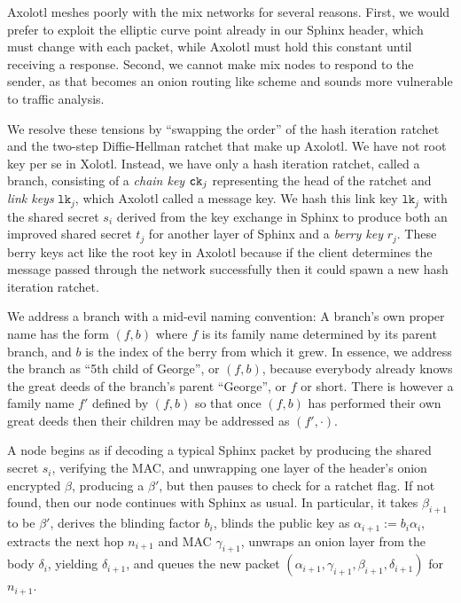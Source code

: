 \documentclass[twoside,letterpaper]{llncs}
\begin{document}
Axolotl meshes poorly with the mix networks for several reasons.
%
First, we would prefer to exploit the elliptic curve point
 already in our Sphinx header, which must change with each packet,
while Axolotl must hold this constant until receiving a response.
%
Second, we cannot make mix nodes to respond to the sender, as that
becomes an onion routing like scheme and sounds more vulnerable to
traffic analysis.

\def\cn{\texttt{cn}}
\def\DH{\texttt{DH}}
\def\lk{\texttt{lk}}
\def\sk{\texttt{sk}}
\def\ECDH{\textrm{ECDH}}

We resolve these tensions by ``swapping the order'' of the hash
iteration ratchet and the two-step Diffie-Hellman ratchet that make
up Axolotl.   
%
We have not root key per se in Xolotl.  
Instead, we have only a hash iteration ratchet, called a branch,
consisting of a {\it chain key} $\texttt{ck}_j$ representing the head of the
ratchet and {\it link keys} $\lk_j$, which Axolotl called a message
key.  We hash this link key $\lk_j$ with the shared secret $s_i$
derived from the key exchange in Sphinx to produce both an improved
shared secret $t_j$ for another layer of Sphinx and a {\it berry key} $r_j$. 
These berry keys act like the root key in Axolotl because if the
client determines the message passed through the network successfully
then it could spawn a new hash iteration ratchet.

We address a branch with a mid-evil naming convention: 
A branch's own proper name has the form $(f,b)$ where
 $f$ is its family name determined by its parent branch, and
 $b$ is the index of the berry from which it grew.
In essence, we address the branch as ``5th child of George'',
or $(f,b)$, because everybody already knows the great deeds
of the branch's parent ``George'', or $f$ or short. 
There is however a family name $f'$ defined by $(f,b)$ so that
once $(f,b)$ has performed their own great deeds then their
children may be addressed as $(f',\cdot)$.

\smallskip {} 

A node begins as if decoding a typical Sphinx packet by
 producing the shared secret $s_i$, verifying the MAC, and 
 unwrapping one layer of the header's onion encrypted $\beta$,
producing a $\beta'$,
but then pauses to check for a ratchet flag. 
If not found, then our node continues with Sphinx as usual.
In particular, it takes $\beta_{i+1}$ to be $\beta'$,
derives the blinding factor $b_i$,
blinds the public key as $\alpha_{i+1} := b_i \alpha_i$,
extracts the next hop $n_{i+1}$ and MAC $\gamma_{i+1}$,
unwraps an onion layer from the body $\delta_i$,
 yielding $\delta_{i+1}$, and queues the new packet
$(\alpha_{i+1},\gamma_{i+1},\beta_{i+1},\delta_{i+1})$ for $n_{i+1}$.
\end{document}
